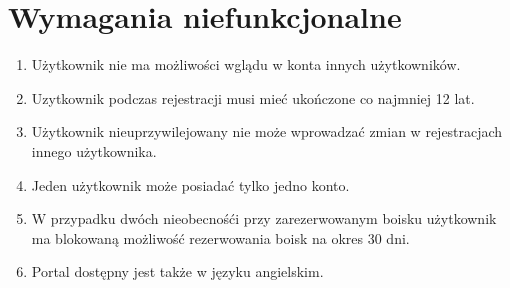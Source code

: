 \documentclass[a4paper,11pt]{article}
\begin{document}
\section {Wymagania niefunkcjonalne}
\begin{enumerate}
	\item Użytkownik nie ma możliwości wglądu w konta innych użytkowników.
	\item Uzytkownik podczas rejestracji musi mieć ukończone co najmniej 12 lat.
	\item Użytkownik nieuprzywilejowany nie może wprowadzać zmian w rejestracjach innego użytkownika.
	\item Jeden użytkownik może posiadać tylko jedno konto.
	\item W przypadku dwóch nieobecnośći przy zarezerwowanym boisku użytkownik ma blokowaną możliwość rezerwowania boisk na okres 30 dni.
	\item Portal dostępny jest także w języku angielskim.
\end{enumerate}
\end{document}

